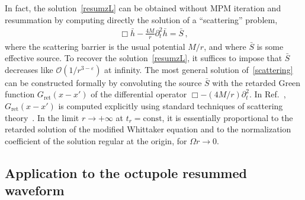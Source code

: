 \documentclass[prd,preprint,superscriptaddress,tightenlines,nofootinbib,
  eqsecnum,showpacs]{revtex4}
\begin{document}
In fact, the solution~\eqref{resumzL} can be obtained without MPM
iteration and resummation by computing directly the solution of a
``scattering'' problem,
%
\begin{align}\label{scattering}
\Box \bar{h} - \frac{4 M}{r} \partial_t^2 \bar{h} = \bar{S} \,,
\end{align}
%
where the scattering barrier is the usual potential $M/r$, and where $\bar{S}$
is some effective source. To recover the solution~\eqref{resumzL}, it suffices
to impose that $\bar{S}$ decreases like $\mathcal{O}(1/r^{3-\varepsilon})$ at
infinity. The most general solution of~\eqref{scattering} can be constructed
formally by convoluting the source $\bar{S}$ with the retarded Green function
$G_\text{ret}(x-x')$ of the differential operator $\Box - (4
M/r) \partial^2_t$. In Ref.~\cite{AF97}, $G_\text{ret}(x-x')$ is computed
explicitly using standard techniques of scattering theory~\cite{Messiah}. In
the limit $r \to +\infty$ at $t_r=\text{const}$, it is essentially
proportional to the retarded solution of the modified Whittaker equation and
to the normalization coefficient of the solution regular at the origin, for
$\Omega r \to 0$.

\subsection{Application to the octupole resummed waveform}
\label{sec:appli}
\end{document}
